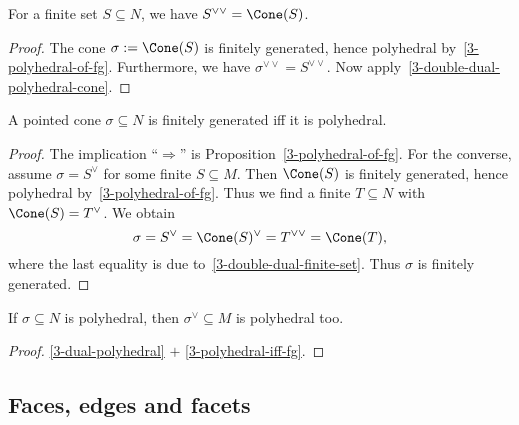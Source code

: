 \begin{proposition}
  \label{3-double-dual-finite-set}
  \uses{}
  \leanok
  For a finite set \( S \subseteq N \), we have \( S^{\vee\vee} =
  \Cone(S) \).
\end{proposition}
\begin{proof}
  \leanok
  The cone \( \sigma := \Cone(S) \) is finitely generated, hence
  polyhedral by~\ref{3-polyhedral-of-fg}. Furthermore, we have \(
  \sigma^{\vee\vee} = S^{\vee\vee} \). Now
  apply~\ref{3-double-dual-polyhedral-cone}.
\end{proof}

\begin{proposition}[Polyhedral = Finitely generated]
  \label{3-polyhedral-iff-fg}
  \uses{}
  \leanok
  A pointed cone \( \sigma \subseteq N \) is finitely generated iff it is
  polyhedral.
\end{proposition}
\begin{proof}
  \leanok
  The implication ``\( \Rightarrow \)'' is
  Proposition~\ref{3-polyhedral-of-fg}. For the converse, assume
  \( \sigma = S^{\vee} \) for some finite \( S \subseteq M \). Then \(
  \Cone(S) \) is finitely generated, hence polyhedral
  by~\ref{3-polyhedral-of-fg}. Thus we find a finite \( T
  \subseteq N \) with \( \Cone(S) = T^\vee \). We obtain
  \[
      \sigma = S^{\vee} = \Cone(S)^\vee = T^{\vee\vee} = \Cone(T),
  \]
  where the last equality is due
  to~\ref{3-double-dual-finite-set}. Thus \( \sigma \) is finitely
  generated.
\end{proof}

\begin{proposition}
  \label{3-dual-polyhedral-cone}
  \leanok
  If \( \sigma \subseteq N \) is
  polyhedral, then \( \sigma^\vee \subseteq M \) is polyhedral too.
\end{proposition}
\begin{proof}
  \leanok
  \ref{3-dual-polyhedral} \( + \) \ref{3-polyhedral-iff-fg}.
\end{proof}


\subsection{Faces, edges and facets}


